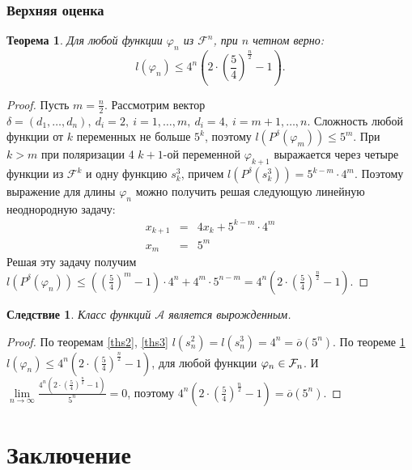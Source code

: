 \documentclass[bibliography=totoc, a4paper, 14pt]{extarticle}
\let\stdsection\section
\renewcommand\section{\newpage\stdsection}
\newtheorem{myth}{Теорема}
\newtheorem*{myco}{Следствие}
\newcommand{\pphi}[1] {P^{\delta}(\varphi_{#1})}
\def\in{\mathchar"3232\nobreak\discretionary{}{\usefont{OMS}{cmsy}{m}{n}\char50}{}}
\begin{document}
\subsubsection{Верхняя оценка}

\begin{myth}
\label{thh}
Для любой функции $\varphi_n$ из $\mathcal{F}^n$, при $n$ четном верно:
$$ l(\varphi_n) \leqslant 4^n\left( 2 \cdot \left (\frac{5}{4} \right)^{\frac{n}{2}} - 1 \right).$$
\end{myth}
\begin{proof}
Пусть $m = \frac{n}{2}$.
Рассмотрим вектор $\delta=(d_1,\dots,d_n),\ d_i = 2,\ i=1,\dots,m,\ d_i=4,
{\ i=m+1,\dots,n}$. Сложность любой функции от $k$ переменных не больше $5^k$, поэтому
$l(\pphi{m}) \leqslant 5^m$. При $k > m$ при поляризации 4 $k+1$-ой переменной
$\varphi_{k+1}$ выражается через четыре функции из $\mathcal{F}^k$ и одну функцию $s^3_k$, причем
$l(P^{\delta}(s^3_k)) = 5^{k-m} \cdot 4^m$. Поэтому выражение для длины
$\varphi_n$ можно получить решая следующую линейную неоднородную задачу:
$$ \begin{array}{lcl}
x_{k+1} &=& 4 x_k + 5^{k-m}\cdot 4^m \\
x_m     &=& 5^m
\end{array} $$
Решая эту задачу получим $l(\pphi{n}) \leqslant \left(\left(\frac{5}{4}\right)^m - 1 \right)\cdot
4^n+4^m\cdot 5^{n-m} = 4^n \left(2 \cdot\left(\frac{5}{4}\right)^{\frac{n}{2}}-1\right)$.
\end{proof}

\begin{myco}
Класс функций $\mathcal{A}$ является вырожденным.
\end{myco}
\begin{proof}
По теоремам \ref{ths2}, \ref{ths3} $l(s^2_n)=l(s^3_n)=4^n=\overline{o}(5^n)$. По теореме \ref{thh}
${l(\varphi_n) \leqslant 4^n \left(2 \cdot\left(\frac{5}{4}\right)^{\frac{n}{2}}-1\right)}$, для
любой функции $\varphi_n \in \mathcal{F}_n$. И $\lim\limits_{n \rightarrow \infty} \frac{4^n
\left(2 \cdot\left(\frac{5}{4}\right)^{\frac{n}{2}}-1\right)}{5^n} = 0$, поэтому
$4^n \left(2 \cdot\left(\frac{5}{4}\right)^{\frac{n}{2}}-1\right) = \overline{o}(5^n)$.
\end{proof}

\newpage
\section{Заключение}
\end{document}
